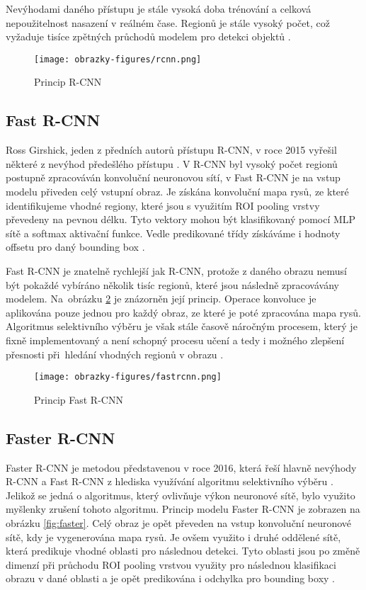 Nevýhodami daného přístupu je stále vysoká doba trénování a celková nepoužitelnost nasazení v reálném čase. Regionů je stále vysoký počet, což vyžaduje tisíce zpětných průchodů modelem pro detekci objektů \cite{ObjectDetectionAlgorithms}.

\begin{figure}[!htbp]
    \centering
    \texttt{[image: obrazky-figures/rcnn.png]}
    \caption{Princip R-CNN \cite{ObjectDetectionAlgorithms}}
    \label{fig:rcnn}
\end{figure} 

\subsection{Fast R-CNN}
Ross Girshick, jeden z předních autorů přístupu R-CNN, v roce 2015 vyřešil některé z nevýhod předešlého přístupu \cite{FastRCNN}. V R-CNN byl vysoký počet regionů postupně zpracováván konvoluční neuronovou sítí, v Fast R-CNN je na vstup modelu přiveden celý vstupní obraz. Je získána konvoluční mapa rysů, ze které identifikujeme vhodné regiony, které jsou s využitím ROI pooling vrstvy převedeny na pevnou délku. Tyto vektory mohou být klasifikovaný pomocí MLP sítě a softmax aktivační funkce. Vedle predikované třídy získáváme i hodnoty offsetu pro daný bounding box \cite{ObjectDetectionAlgorithms}.

Fast R-CNN je znatelně rychlejší jak R-CNN, protože z daného obrazu nemusí být pokaždé vybíráno několik tisíc regionů, které jsou následně zpracovávány modelem. Na~obrázku \ref{fig:fastrcnn} je znázorněn její princip. Operace konvoluce je aplikována pouze jednou pro každý obraz, ze které je poté zpracována mapa rysů. Algoritmus selektivního výběru je však stále časově náročným procesem, který je fixně implementovaný a není schopný procesu učení a tedy i možného zlepšení přesnosti při~hledání vhodných regionů v obrazu \cite{ObjectDetectionAlgorithms}.

\begin{figure}[!htbp]
    \centering
    \texttt{[image: obrazky-figures/fastrcnn.png]}
    \caption{Princip Fast R-CNN \cite{ObjectDetectionAlgorithms}}
    \label{fig:fastrcnn}
\end{figure} 

\subsection{Faster R-CNN}
Faster R-CNN je metodou představenou v roce 2016, která řeší hlavně nevýhody R-CNN a Fast R-CNN z hlediska využívání algoritmu selektivního výběru \cite{FasterRCNN}. Jelikož se jedná o algoritmus, který ovlivňuje výkon neuronové sítě, bylo využito myšlenky zrušení tohoto algoritmu. Princip modelu Faster R-CNN je zobrazen na obrázku \ref{fig:faster}. Celý obraz je opět převeden na vstup konvoluční neuronové sítě, kdy je vygenerována mapa rysů. Je ovšem využito i druhé oddělené sítě, která predikuje vhodné oblasti pro následnou detekci. Tyto oblasti jsou po změně dimenzí při průchodu ROI pooling vrstvou využity pro následnou klasifikaci obrazu v dané oblasti a je opět predikována i odchylka pro bounding boxy \cite{ObjectDetectionAlgorithms}.

